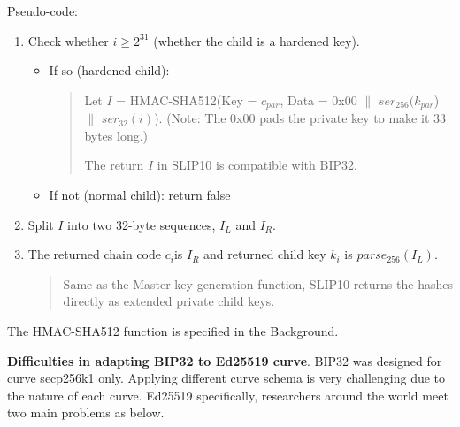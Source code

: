 Pseudo-code:
\begin{enumerate}
    \item Check whether $i \geq 2^{31}$ (whether the child is a hardened key).
          \begin{itemize}
              \item If so (hardened child):
                    \begin{quote}

                        Let $I$ = HMAC-SHA512(Key = $c_{par}$, Data = 0x00 $\parallel$ $ser_{256}(k_{par}$) $\parallel$ $ser_{32}(i)$). (Note: The 0x00 pads the private key to make it 33 bytes long.)

                        The return $I$ in SLIP10 is compatible with BIP32.
                    \end{quote}

              \item If not (normal child): return false

          \end{itemize}
          \bigskip

    \item Split $I$ into two 32-byte sequences, $I_L$ and $I_R$.
          \bigskip

    \item The returned chain code  $c_i$is $I_R$ and returned child key $k_i$ is $parse_{256}(I_L)$.
          \begin{quote}
              Same as the Master key generation function, SLIP10 returns the hashes directly as extended private child keys.
          \end{quote}
\end{enumerate}

The HMAC-SHA512 function is specified in the Background.

\bigskip
{\textbf{Difficulties in adapting BIP32 to Ed25519 curve}}. BIP32 was designed for curve secp256k1 only. Applying different curve schema is very challenging due to the nature of each curve. Ed25519 specifically, researchers around the world meet two main problems as below.


